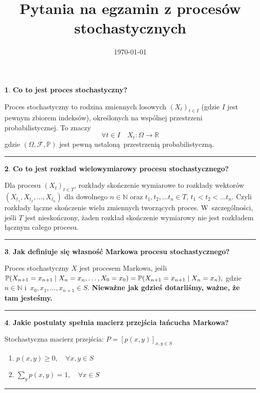 \documentclass[
    twocolumn,
    twoside,
    fontsize=11pt,
    paper=A0,
    DIV=30
]{scrartcl}
\title{Pytania na egzamin z procesów stochastycznych}
\date{\today}
\theoremstyle{definition}
\newtheorem{pytanie}{}
\theoremstyle{break}
\newenvironment{odpowiedź}{\vspace{-0.7em}}{\vspace{0.3em}\hrule}
\begin{document}

\begin{pytanie}
\textbf{Co to jest proces stochastyczny?}
\end{pytanie}
\begin{odpowiedź}
    Proces stochastyczny to rodzina zmiennych losowych $(X_t)_{t\in I}$
    (gdzie $I$ jest pewnym zbiorem indeksów), określonych na wspólnej
    przestrzeni probabilistycznej. To znaczy \[
    \forall t \in I \quad X_t : \Omega \to \mathbb{R}
    \]
    gdzie $(\Omega, \mathcal{F}, \mathbb{P})$ jest pewną ustaloną przestrzenią
    probabilistyczną.
\end{odpowiedź}


\begin{pytanie}
\textbf{Co to jest rozkład wielowymiarowy procesu stochastycznego?}
\end{pytanie}
\begin{odpowiedź}
    Dla procesu $(X_t)_{t\in T}$, rozkłady skończenie wymiarowe
    to rozkłady wektorów $(X_{t_1}, X_{t_2}, \ldots, X_{t_n})$
    dla dowolnego $n \in \mathbb{N}$ oraz $t_1, t_2, \ldots t_n \in T$,
    $t_1 < t_2 < \ldots t_n$.
    Czyli rozkłady łączne skończenie wielu zmiennych tworzących proces.
    W~szczególności, jeśli $T$ jest nieskończony, żaden
    rozkład skończenie wymiarowy nie jest rozkładem łącznym
    całego procesu.
\end{odpowiedź}


\begin{pytanie}
\textbf{Jak definiuje się własność Markowa procesu stochastycznego?}
\end{pytanie}
\begin{odpowiedź}
    Proces stochastyczny $X$ jest procesem Markowa, jeśli $
    \mathbb{P}(X_{n+1}=x_{n+1}\mid X_n=x_n,\ldots ,X_0=x_0)\\
    = \mathbb{P}(X_{n+1}=x_{n+1}\mid X_n=x_n),
    $
    gdzie $n \in \mathbb{N}$ i~$x_0, x_1, \ldots, x_{n+1} \in S$.
    {\bf Nieważne jak gdzieś dotarliśmy, ważne, że tam jesteśmy.}
\end{odpowiedź}


\begin{pytanie}
\textbf{Jakie postulaty spełnia macierz przejścia łańcucha Markowa?}
\end{pytanie}
\begin{odpowiedź}
    Stochastyczna macierz przejścia: $P = [p(x,y)]_{x, y\in S}$
    \begin{enumerate}
        \item $p(x, y) \geq 0, \quad \forall x, y \in S$
        \item $\sum_{y} p(x, y) = 1, \quad \forall x \in S$
    \end{enumerate}
\end{odpowiedź}
\end{document}
